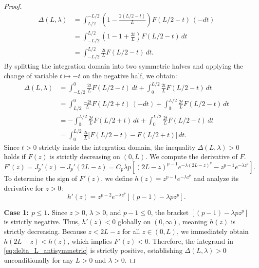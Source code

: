 \documentclass[11pt, a4paper]{article}
\theoremstyle{break}
\theoremstyle{break}
\theoremstyle{break}
\theoremstyle{break}
\theoremstyle{break}
\theoremstyle{break}
\theoremstyle{break}
\theoremstyle{break}
\theoremstyle{break}
\begin{document}
\begin{proof}
    \begin{align*}
        \Delta(L, \lambda) &= \int_{L/2}^{-L/2} \left( 1 - \frac{2(L/2 - t)}{L} \right) F(L/2 - t) \, (-dt) \\
        &= \int_{-L/2}^{L/2} \left( 1 - 1 + \frac{2t}{L} \right) F(L/2 - t) \, dt \\
        &= \int_{-L/2}^{L/2} \frac{2t}{L} F(L/2 - t) \, dt.
    \end{align*}
    By splitting the integration domain into two symmetric halves and applying the change of variable $t \mapsto -t$ on the negative half, we obtain:
    \begin{align}
        \Delta(L, \lambda) &= \int_{-L/2}^0 \frac{2t}{L} F(L/2 - t) \, dt + \int_0^{L/2} \frac{2t}{L} F(L/2 - t) \, dt \nonumber \\
        &= \int_{L/2}^0 \frac{-2t}{L} F(L/2 + t) \, (-dt) + \int_0^{L/2} \frac{2t}{L} F(L/2 - t) \, dt \nonumber \\
        &= -\int_0^{L/2} \frac{2t}{L} F(L/2 + t) \, dt + \int_0^{L/2} \frac{2t}{L} F(L/2 - t) \, dt \nonumber \\
        &= \int_0^{L/2} \frac{2t}{L} \Big[ F(L/2 - t) - F(L/2 + t) \Big] \, dt. \label{eq:delta_L_antisymmetric}
    \end{align}
    Since $t > 0$ strictly inside the integration domain, the inequality $\Delta(L, \lambda) > 0$ holds if $F(z)$ is strictly decreasing on $(0, L)$. We compute the derivative of $F$.
    \begin{equation*}
        F'(z) = J_p'(z) - J_p'(2L-z) = C_p \lambda p \left[ (2L-z)^{p-1} e^{-\lambda(2L-z)^p} - z^{p-1} e^{-\lambda z^p} \right].
    \end{equation*}
    To determine the sign of $F'(z)$, we define $h(z) = z^{p-1} e^{-\lambda z^p}$ and analyze its derivative for $z > 0$:
    \begin{equation*}
        h'(z) = z^{p-2} e^{-\lambda z^p} \left[ (p-1) - \lambda p z^p \right].
    \end{equation*}

    \textbf{Case 1: $p \le 1$.} 
    Since $z > 0$, $\lambda > 0$, and $p-1 \le 0$, the bracket $\left[ (p-1) - \lambda p z^p \right]$ is strictly negative. Thus, $h'(z) < 0$ globally on $(0, \infty)$, meaning $h(z)$ is strictly decreasing. Because $z < 2L-z$ for all $z \in (0, L)$, we immediately obtain $h(2L-z) < h(z)$, which implies $F'(z) < 0$. Therefore, the integrand in \eqref{eq:delta_L_antisymmetric} is strictly positive, establishing $\Delta(L, \lambda) > 0$ unconditionally for any $L > 0$ and $\lambda > 0$.


\end{proof}
\end{document}
